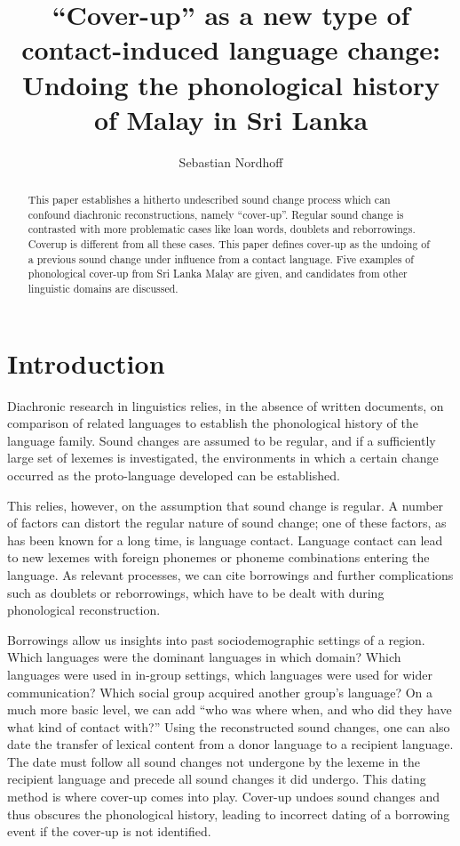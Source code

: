 \documentclass[a4paper,10pt]{article}
\title{``Cover-up'' as a new type of contact-induced language change: Undoing the phonological history of Malay in Sri Lanka}
\author{Sebastian Nordhoff}
\begin{document}
\maketitle

\begin{abstract}
This paper establishes a hitherto undescribed sound change process which can confound diachronic reconstructions, namely ``cover-up''.  Regular sound change is contrasted with more problematic cases like loan words, doublets and reborrowings. Coverup is different from all these cases. This paper defines cover-up as the undoing of a previous sound change under influence from a contact language. Five examples of phonological cover-up from Sri Lanka Malay are given, and candidates from other linguistic domains are discussed. 
\end{abstract}


% 
% 
 
\section{Introduction}
Diachronic research in linguistics relies, in the absence of written documents, on comparison of related languages to establish the phonological history of the language family. Sound changes are assumed to be regular, and if a sufficiently large set of lexemes is investigated, the environments in which a certain change occurred as the proto-language developed can be established.

This relies, however, on the assumption that sound change is regular. A number of factors can distort the regular nature of sound change; one of these factors, as has been known for a long time, is language contact. Language contact can lead to new lexemes with foreign phonemes or phoneme combinations entering the language. As relevant processes, we can cite borrowings and further complications such as doublets or reborrowings, which have to be dealt with during phonological reconstruction. 

Borrowings allow us insights into past sociodemographic settings of a region. Which languages were the dominant languages in which domain? Which languages were used in in-group settings, which languages were used for wider communication? Which social group acquired another group's language? On a much more basic level, we can add ``who was where when, and who did they have what kind of contact with?'' Using the reconstructed sound changes, one can also date the transfer of lexical content from a donor language to a recipient language. The date must follow all sound changes not undergone by the lexeme in the recipient language and precede all sound changes it did undergo. This dating method is where cover-up comes into play. Cover-up undoes sound changes and thus obscures the phonological history, leading to incorrect dating of a borrowing event if the cover-up is not identified. 
\end{document}

